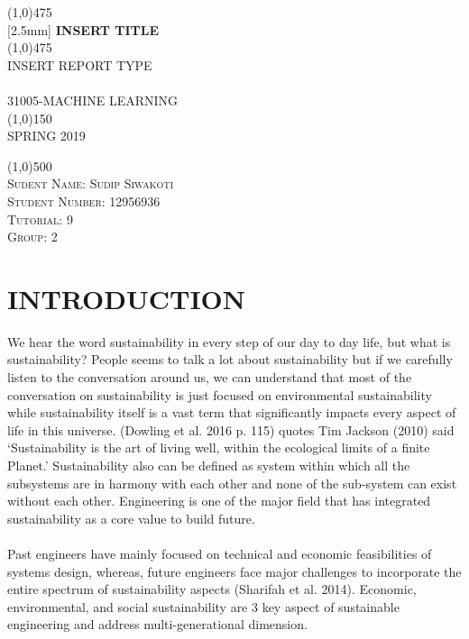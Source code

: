 \documentclass{article}
\begin{document}
\begin{titlepage}
	\begin{center}
    \line(1,0){475}\\
   [2.5mm]
    \huge{\bfseries INSERT TITLE}\\
    \line(1,0){475}\\
    [3mm]
    \textsc{\Large INSERT REPORT TYPE}\\
    [6cm]
    \textsc{\small \\
    [1mm]
    31005-MACHINE LEARNING\\
    \line(1,0){150}\\
    SPRING 2019}\\
    [6.cm]
    \end{center}
    \begin{flushleft}
    \line(1,0){500}\\
    \textsc{\large Sudent Name: Sudip Siwakoti \\Student Number: 12956936\\ Tutorial: 9 \\ Group: 2 }
    \end{flushleft}
    \lipsum[0]
\end{titlepage}
\tableofcontents
\thispagestyle{empty}
\cleardoublepage
\setcounter{page}{1}

\section{INTRODUCTION}\label{sec:intor}


We hear the word sustainability in every step of our day to day life, but what is sustainability? People seems to talk a lot about sustainability but if we carefully listen to the conversation around us, we can understand that most of the conversation on sustainability is just focused on environmental sustainability while sustainability itself is a vast term that significantly impacts every aspect of life in this universe. (Dowling et al. 2016 p. 115) quotes Tim Jackson (2010) said ‘Sustainability is the art of living well, within the ecological limits of a finite Planet.’  Sustainability also can be defined as system within which all the subsystems are in harmony with each other and none of the sub-system can exist without each other. Engineering is one of the major field that has integrated sustainability as a core value to build future.\\
\\
Past engineers have mainly focused on technical and economic feasibilities of systems design, whereas, future engineers face major challenges to incorporate  the entire spectrum of sustainability aspects (Sharifah et al. 2014).  Economic, environmental, and social sustainability are 3 key aspect of sustainable engineering and address multi-generational dimension.
\end{document}
